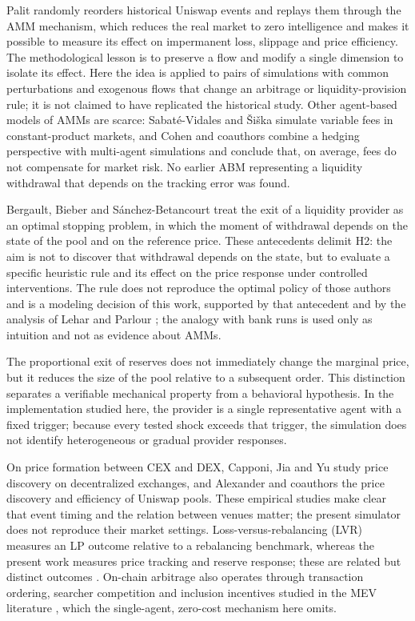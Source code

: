 Palit \cite{palit2022shuffled} randomly reorders historical Uniswap events and replays them through the AMM mechanism, which reduces the real market to zero intelligence and makes it possible to measure its effect on impermanent loss, slippage and price efficiency. The methodological lesson is to preserve a flow and modify a single dimension to isolate its effect. Here the idea is applied to pairs of simulations with common perturbations and exogenous flows that change an arbitrage or liquidity-provision rule; it is not claimed to have replicated the historical study. Other agent-based models of AMMs are scarce: Sabaté-Vidales and Šiška \cite{sabatevidales2023variable} simulate variable fees in constant-product markets, and Cohen and coauthors \cite{cohen2023inefficiency} combine a hedging perspective with multi-agent simulations and conclude that, on average, fees do not compensate for market risk. No earlier ABM representing a liquidity withdrawal that depends on the tracking error was found.

Bergault, Bieber and Sánchez-Betancourt \cite{bergault2025exit} treat the exit of a liquidity provider as an optimal stopping problem, in which the moment of withdrawal depends on the state of the pool and on the reference price. These antecedents delimit H2: the aim is not to discover that withdrawal depends on the state, but to evaluate a specific heuristic rule and its effect on the price response under controlled interventions. The rule does not reproduce the optimal policy of those authors and is a modeling decision of this work, supported by that antecedent and by the analysis of Lehar and Parlour \cite{lehar2025uniswap}; the analogy with bank runs \cite{diamond1983bank} is used only as intuition and not as evidence about AMMs.

The proportional exit of reserves does not immediately change the marginal price, but it reduces the size of the pool relative to a subsequent order. This distinction separates a verifiable mechanical property from a behavioral hypothesis. In the implementation studied here, the provider is a single representative agent with a fixed trigger; because every tested shock exceeds that trigger, the simulation does not identify heterogeneous or gradual provider responses.

On price formation between CEX and DEX, Capponi, Jia and Yu \cite{capponi2026price} study price discovery on decentralized exchanges, and Alexander and coauthors \cite{alexander2025price} the price discovery and efficiency of Uniswap pools. These empirical studies make clear that event timing and the relation between venues matter; the present simulator does not reproduce their market settings. Loss-versus-rebalancing (LVR) measures an LP outcome relative to a rebalancing benchmark, whereas the present work measures price tracking and reserve response; these are related but distinct outcomes \cite{milionis2022lvr,milionis2022quantifying}. On-chain arbitrage also operates through transaction ordering, searcher competition and inclusion incentives studied in the MEV literature \cite{daian2020flash,zhou2021hft}, which the single-agent, zero-cost mechanism here omits.

